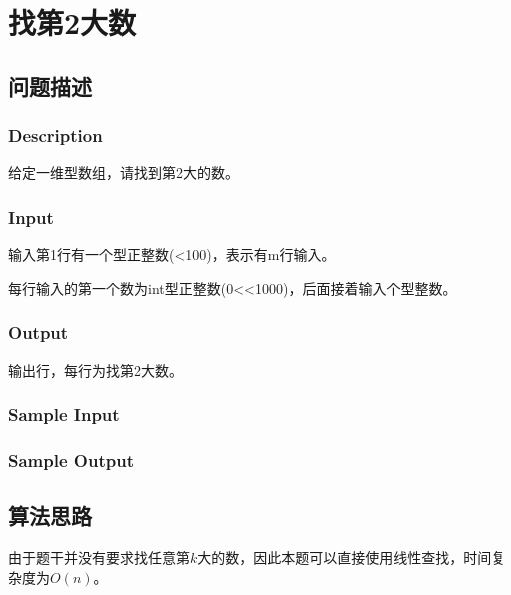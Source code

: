 \section{找第2大数}
\subsection{问题描述}
\subsubsection*{Description}
给定一维型数组，请找到第2大的数。

\subsubsection*{Input}

输入第1行有一个型正整数(<100)，表示有m行输入。

每行输入的第一个数为int型正整数(0<<1000)，后面接着输入个型整数。

\subsubsection*{Output}

输出行，每行为找第2大数。

\subsubsection*{Sample Input}




\subsubsection*{Sample Output}



\subsection{算法思路}

由于题干并没有要求找任意第$k$大的数，因此本题可以直接使用线性查找，时间复杂度为$O(n)$。


